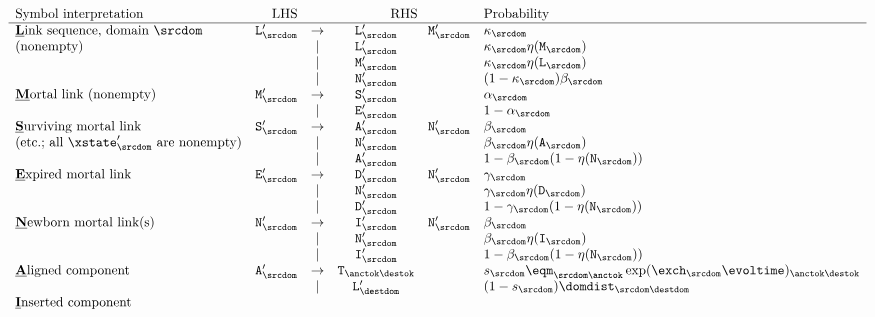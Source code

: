 \[
\begin{array}{lrcccl}
\mbox{Symbol interpretation} & \mbox{LHS} & & \multicolumn{2}{c}{\mbox{RHS}} & \mbox{Probability} \\
\hline
\mbox{\underline{\bf L}ink sequence, domain $\srcdom$} &
\ntlinks'_\srcdom & \to & \ntlinks'_\srcdom & \ntmor'_\srcdom & \kappa_\srcdom \\
\mbox{(nonempty)} & & | & \ntlinks'_\srcdom & & \kappa_\srcdom \nullability(\ntmor_\srcdom) \\
& & | & \ntmor'_\srcdom & & \kappa_\srcdom \nullability(\ntlinks_\srcdom) \\
& & | & \ntnew'_\srcdom & & (1 - \kappa_\srcdom) \beta_\srcdom \\
\mbox{\underline{\bf M}ortal link (nonempty)} &
\ntmor'_\srcdom & \to & \ntsur'_\srcdom & & \alpha_\srcdom \\
& & | & \ntexp'_\srcdom & & 1 - \alpha_\srcdom \\
\mbox{\underline{\bf S}urviving mortal link} &
\ntsur'_\srcdom & \to & \ntaln'_\srcdom & \ntnew'_\srcdom & \beta_\srcdom \\
\mbox{(etc.; all $\xstate'_\srcdom$ are nonempty)} & & | & \ntnew'_\srcdom & & \beta_\srcdom \nullability(\ntaln_\srcdom) \\
& & | & \ntaln'_\srcdom & & 1 - \beta_\srcdom(1 - \nullability(\ntnew_\srcdom)) \\
\mbox{\underline{\bf E}xpired mortal link} &
\ntexp'_\srcdom & \to & \ntdel'_\srcdom & \ntnew'_\srcdom & \gamma_\srcdom \\
& & | & \ntnew'_\srcdom & & \gamma_\srcdom \nullability(\ntdel_\srcdom) \\
& & | & \ntdel'_\srcdom & & 1 - \gamma_\srcdom(1 - \nullability(\ntnew_\srcdom)) \\
\mbox{\underline{\bf N}ewborn mortal link(s)} &
\ntnew'_\srcdom & \to & \ntins'_\srcdom & \ntnew'_\srcdom & \beta_\srcdom \\
& & | & \ntnew'_\srcdom & & \beta_\srcdom \nullability(\ntins_\srcdom) \\
& & | & \ntins'_\srcdom & & 1 - \beta_\srcdom(1 - \nullability(\ntnew_\srcdom)) \\
\mbox{\underline{\bf A}ligned component} &
\ntaln'_\srcdom & \to & \term_{\anctok\destok} & & \tok_\srcdom \eqm_{\srcdom\anctok} \exp(\exch_\srcdom \evoltime)_{\anctok\destok}\\
& & | & \ntlinks'_\destdom & & (1 - \tok_\srcdom) \domdist_{\srcdom\destdom} \\
\mbox{\underline{\bf I}nserted component} &

\end{array}\]
